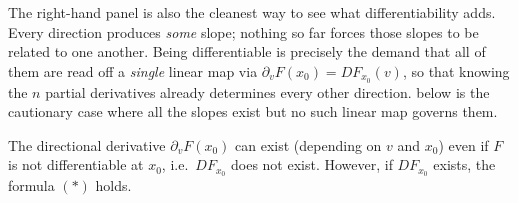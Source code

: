 \begin{center}
\end{center}

The right-hand panel is also the cleanest way to see what differentiability adds. Every direction
produces \emph{some} slope; nothing so far forces those slopes to be related to one another. Being
differentiable is precisely the demand that all of them are read off a \emph{single} linear map
via $\partial_vF(x_0) = DF_{x_0}(v)$, so that knowing the $n$ partial derivatives already
determines every other direction.  below is the
cautionary case where all the slopes exist but no such linear map governs them.

\begin{importantremark}
\label{rem:directional_derivative_caveat}
The directional derivative $\partial_v F(x_0)$ can exist (depending on $v$ and $x_0$) even if $F$
is not differentiable at $x_0$, i.e.\ $DF_{x_0}$ does not exist. However, if $DF_{x_0}$ exists,
the formula $(*)$ holds.
\end{importantremark}

